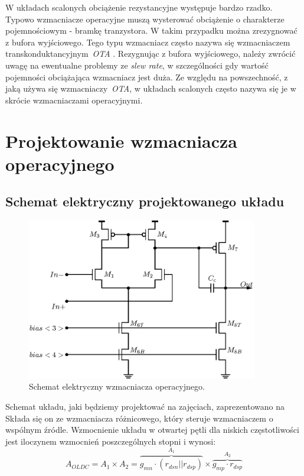 \documentclass[twoside,pl,final]{labman}
\begin{document}
W układach scalonych obciążenie rezystancyjne występuje bardzo rzadko.
Typowo wzmacniacze operacyjne muszą wysterować obciążenie
o charakterze pojemnościowym - bramkę tranzystora.
W takim przypadku można zrezygnować z bufora wyjściowego.
Tego typu wzmacniacz często nazywa się wzmacniaczem
transkonduktancyjnym~\emph{OTA} .
Rezygnując z bufora wyjściowego, należy zwrócić uwagę na
ewentualne problemy ze \emph{slew rate}, w szczególności gdy wartość
pojemności obciążająca wzmacniacz jest duża.
Ze względu na powszechność, z jaką używa się wzmacniaczy~\emph{OTA},
w układach scalonych często nazywa się je w skrócie wzmacniaczami operacyjnymi.

\chapter{Projektowanie wzmacniacza operacyjnego}
\label{opamp}

\section{Schemat elektryczny projektowanego układu}
\label{opamp:schematic}
\begin{figure}[!htbp]
  \centering
  \includegraphics[width=0.9\textwidth]{schematic}
  \caption{Schemat elektryczny wzmacniacza operacyjnego.}
  \label{fig:schematic}
\end{figure}

Schemat układu, jaki będziemy projektować
na zajęciach, zaprezentowano na~
Składa się on ze wzmacniacza różnicowego, który steruje
wzmacniaczem o wspólnym źródle.
Wzmocnienie układu w otwartej pętli dla niskich częstotliwości
jest iloczynem wzmocnień poszczególnych stopni i wynosi:
\begin{equation}
  A_{OLDC} = A_1 \times A_2 =
    \overbrace{g_{mn} \cdot (r_{dsn} || r_{dsp})}^{A_1} \times
    \overbrace{g_{mp} \cdot r_{dsp}}^{A_2}
\end{equation}
\end{document}
